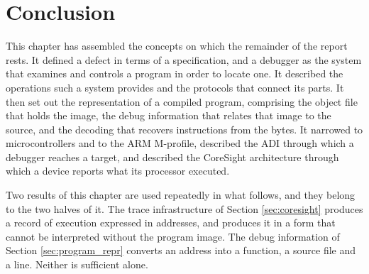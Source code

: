 \section{Conclusion}
This chapter has assembled the concepts on which the remainder of the report rests. It defined a defect in terms of a specification, and a debugger as the system that examines and controls a program in order to locate one. It described the operations such a system provides and the protocols that connect its parts. It then set out the representation of a compiled program, comprising the object file that holds the image, the debug information that relates that image to the source, and the decoding that recovers instructions from the bytes. It narrowed to microcontrollers and to the ARM M-profile, described the ADI through which a debugger reaches a target, and described the CoreSight architecture through which a device reports what its processor executed.

Two results of this chapter are used repeatedly in what follows, and they belong to the two halves of it. The trace infrastructure of Section \ref{sec:coresight} produces a record of execution expressed in addresses, and produces it in a form that cannot be interpreted without the program image. The debug information of Section \ref{sec:program_repr} converts an address into a function, a source file and a line. Neither is sufficient alone.
